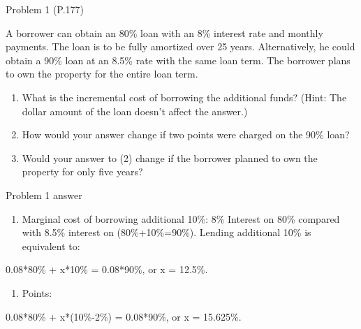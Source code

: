 \documentclass[ignorenonframetext,]{beamer}
\providecommand{\tightlist}{%
\setlength{\itemsep}{0pt}\setlength{\parskip}{0pt}}
\begin{document}
\begin{frame}{Problem 1 (P.177)}

\small
A borrower can obtain an 80\% loan with an 8\% interest rate and monthly
payments. The loan is to be fully amortized over 25 years.
Alternatively, he could obtain a 90\% loan at an 8.5\% rate with the
same loan term. The borrower plans to own the property for the entire
loan term.

\begin{enumerate}
\def\labelenumi{\arabic{enumi}.}
\tightlist
\item
  What is the incremental cost of borrowing the additional funds? (Hint:
  The dollar amount of the loan doesn't affect the answer.)
\item
  How would your answer change if two points were charged on the 90\%
  loan?
\item
  Would your answer to (2) change if the borrower planned to own the
  property for only five years?
\end{enumerate}

\end{frame}

\begin{frame}{Problem 1 answer}

\begin{enumerate}
\def\labelenumi{\arabic{enumi}.}
\tightlist
\item
  Marginal cost of borrowing additional 10\%: 8\% Interest on 80\%
  compared with 8.5\% interest on (80\%+10\%=90\%). Lending additional
  10\% is equivalent to:
\end{enumerate}

0.08*80\% + x*10\% = 0.08*90\%, or x = 12.5\%.

\begin{enumerate}
\def\labelenumi{\arabic{enumi}.}
\setcounter{enumi}{1}
\tightlist
\item
  Points:
\end{enumerate}

0.08*80\% + x*(10\%-2\%) = 0.08*90\%, or x = 15.625\%.

\end{frame}
\end{document}
